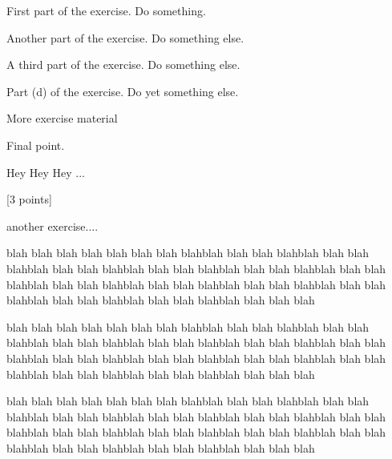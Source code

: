 \documentclass[11pt,a4paper]{article}
\begin{document}
\MakeUebungHeader

\exstarred
{}

\begin{exenumerate}
\item First part of the exercise. Do something.
\item Another part of the exercise. Do something else.
\exstarred\item A third part of the exercise. Do something else.
\item Part (d) of the exercise. Do yet something else.
\exstarred\item More exercise material
\item Final point.
\end{exenumerate}


Hey Hey Hey ...

\exstarred{}[3 points]

another exercise....


blah blah blah blah blah blah blah blahblah blah blah blahblah blah blah blahblah blah
blah blahblah blah blah blahblah blah blah blahblah blah blah blahblah blah blah blahblah
blah blah blahblah blah blah blahblah blah blah blahblah blah blah blahblah blah blah
blahblah blah blah blah

\exstarred{}

blah blah blah blah blah blah blah blahblah blah blah blahblah blah blah blahblah blah
blah blahblah blah blah blahblah blah blah blahblah blah blah blahblah blah blah blahblah
blah blah blahblah blah blah blahblah blah blah blahblah blah blah blahblah blah blah
blahblah blah blah blah


blah blah blah blah blah blah blah blahblah blah blah blahblah blah blah blahblah blah
blah blahblah blah blah blahblah blah blah blahblah blah blah blahblah blah blah blahblah
blah blah blahblah blah blah blahblah blah blah blahblah blah blah blahblah blah blah
blahblah blah blah blah
\end{document}

